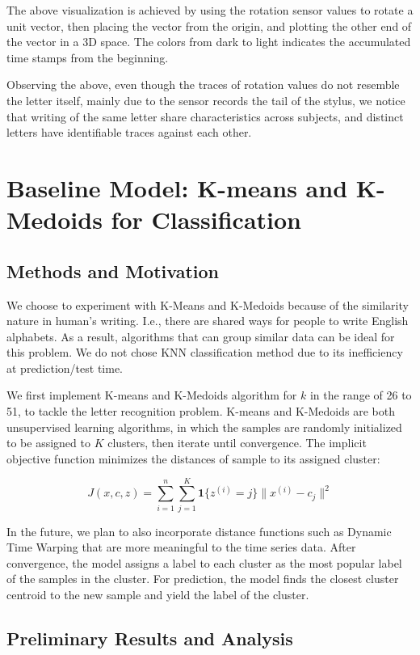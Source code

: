 \documentclass{article}
\begin{document}
The above visualization is achieved by using the rotation sensor values to rotate a unit vector, then placing the vector from the origin, and plotting the other end of the vector in a 3D space. The colors from dark to light indicates the accumulated time stamps from the beginning.

Observing the above, even though the traces of rotation values do not resemble the letter itself, mainly due to the sensor records the tail of the stylus, we notice that writing of the same letter share characteristics across subjects, and distinct letters have identifiable traces against each other.


\section{Baseline Model: K-means and K-Medoids for Classification}

\subsection{Methods and Motivation}

We choose to experiment with K-Means and K-Medoids because of the similarity nature in human's writing. I.e., there are shared ways for people to write English alphabets. As a result, algorithms that can group similar data can be ideal for this problem. We do not chose KNN classification method due to its inefficiency at prediction/test time.

We first implement K-means and K-Medoids algorithm for $k$ in the range of 26 to 51, to tackle the letter recognition problem. K-means and K-Medoids are both unsupervised learning algorithms, in which the samples are randomly initialized to be assigned to $K$ clusters, then iterate until convergence. The implicit objective function minimizes the distances of sample to its assigned cluster:

\[
J(x,c,z) = \sum_{i=1}^n \sum_{j=1}^K \mathbf{1}\{z^{(i)} = j\} \|x^{(i)} - c_j\|^2
\]

In the future, we plan to also incorporate distance functions such as Dynamic Time Warping\cite{bib8} that are more meaningful to the time series data. After convergence, the model assigns a label to each cluster as the most popular label of the samples in the cluster. For prediction, the model finds the closest cluster centroid to the new sample and yield the label of the cluster.

\subsection{Preliminary Results and Analysis}
\end{document}
